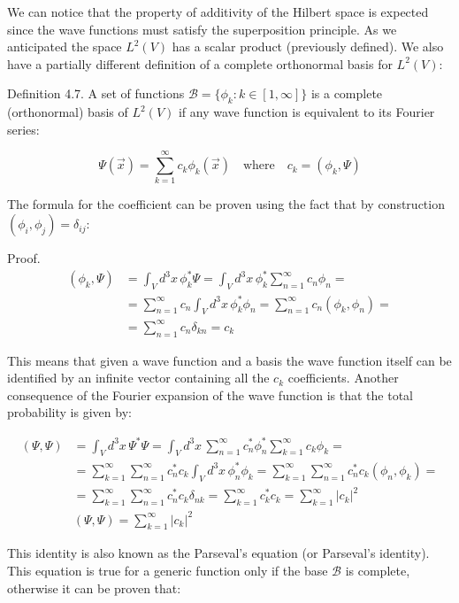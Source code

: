 We can notice that the property of additivity of the Hilbert space is expected since the wave functions must satisfy the superposition principle. As we anticipated the space $L^2(V)$ has a scalar product (previously defined). We also have a partially different definition of a complete orthonormal basis for $L^2(V)$:

Definition 4.7. A set of functions $\mathcal{B} = \{\phi_k: k \in [1,\infty]\}$ is a complete (orthonormal) basis of $L^2(V)$ if any wave function is equivalent to its Fourier series:

\begin{equation}
\Psi(\vec{x}) = \sum_{k=1}^{\infty} c_k\phi_k(\vec{x}) \quad \text{where} \quad c_k = (\phi_k, \Psi)
\end{equation}

The formula for the coefficient can be proven using the fact that by construction $(\phi_i, \phi_j) = \delta_{ij}$:

Proof.
\begin{align}
(\phi_k, \Psi) &= \int_V d^3x\,\phi_k^*\Psi = \int_V d^3x\,\phi_k^*\sum_{n=1}^{\infty}c_n\phi_n = \\
&= \sum_{n=1}^{\infty}c_n\int_V d^3x\,\phi_k^*\phi_n = \sum_{n=1}^{\infty}c_n(\phi_k, \phi_n) =  \\
&= \sum_{n=1}^{\infty}c_n\delta_{kn} = c_k
\end{align}

This means that given a wave function and a basis the wave function itself can be identified by an infinite vector containing all the $c_k$ coefficients. Another consequence of the Fourier expansion of the wave function is that the total probability is given by:

\begin{align}
(\Psi, \Psi) &= \int_V d^3x\,\Psi^*\Psi = \int_V d^3x\,\sum_{n=1}^{\infty}c_n^*\phi_n^*\sum_{k=1}^{\infty}c_k\phi_k = \\
&= \sum_{k=1}^{\infty}\sum_{n=1}^{\infty}c_n^*c_k\int_V d^3x\,\phi_n^*\phi_k = \sum_{k=1}^{\infty}\sum_{n=1}^{\infty}c_n^*c_k(\phi_n, \phi_k) = \\
&= \sum_{k=1}^{\infty}\sum_{n=1}^{\infty}c_n^*c_k\delta_{nk} = \sum_{k=1}^{\infty}c_k^*c_k = \sum_{k=1}^{\infty}|c_k|^2  \\
&(\Psi, \Psi) = \sum_{k=1}^{\infty}|c_k|^2
\end{align}

This identity is also known as the Parseval's equation (or Parseval's identity). This equation is true for a generic function only if the base $\mathcal{B}$ is complete, otherwise it can be proven that:

